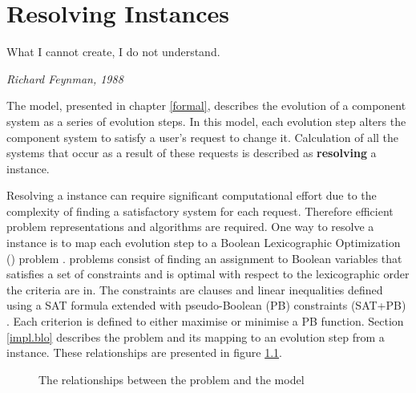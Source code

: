 \chapter{Resolving \modelname Instances}
\label{implementation}
\epigraph{What I cannot create, I do not understand.}
{\textit{Richard Feynman, 1988}}
The \modelname model, presented in chapter \ref{formal}, describes the evolution of a component system as a series of evolution steps.
In this model, each evolution step alters the component system to satisfy a user's request to change it.
Calculation of all the systems that occur as a result of these requests is described as \textbf{resolving} a \modelname instance.

Resolving a \modelname instance can require significant computational effort due to the complexity of finding a satisfactory system for each request.
Therefore efficient problem representations and algorithms are required.
One way to resolve a \modelname instance is to map each evolution step to a Boolean Lexicographic Optimization (\modelimpl) problem \citep{marque2011blex}.
\modelimpl problems consist of finding an assignment to Boolean variables that satisfies a set of constraints and is optimal with respect to the lexicographic order the criteria are in.
The constraints are clauses and linear inequalities defined using a SAT formula extended with pseudo-Boolean (PB) constraints (SAT+PB) \citep{dixon2004automating}.
Each criterion is defined to either maximise or minimise a PB function.
Section \ref{impl.blo} describes the \modelimpl problem and its mapping to an evolution step from a \modelname instance.
These relationships are presented in figure \ref{impl.modelsatdiagram}.

\begin{figure}[htp]
\begin{center}
  \caption{The relationships between the \modelimpl problem and the \modelname model}
  \label{impl.modelsatdiagram}
\end{center}
\end{figure}

